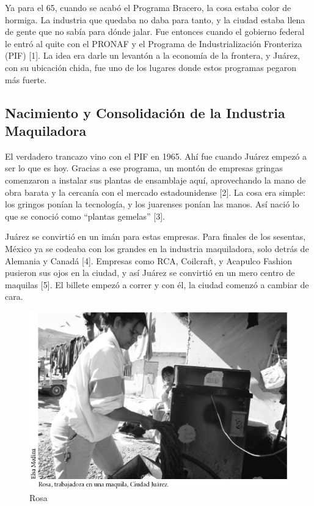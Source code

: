 \documentclass[
  10pt,
  letterpaper,
]{book}
\begin{document}
Ya para el 65, cuando se acabó el Programa Bracero, la cosa estaba color
de hormiga. La industria que quedaba no daba para tanto, y la ciudad
estaba llena de gente que no sabía para dónde jalar. Fue entonces cuando
el gobierno federal le entró al quite con el PRONAF y el Programa de
Industrialización Fronteriza (PIF) {[}1{]}. La idea era darle un
levantón a la economía de la frontera, y Juárez, con su ubicación chida,
fue uno de los lugares donde estos programas pegaron más fuerte.

\subsection{Nacimiento y Consolidación de la Industria
Maquiladora}\label{nacimiento-y-consolidaciuxf3n-de-la-industria-maquiladora}

El verdadero trancazo vino con el PIF en 1965. Ahí fue cuando Juárez
empezó a ser lo que es hoy. Gracias a ese programa, un montón de
empresas gringas comenzaron a instalar sus plantas de ensamblaje aquí,
aprovechando la mano de obra barata y la cercanía con el mercado
estadounidense {[}2{]}. La cosa era simple: los gringos ponían la
tecnología, y los juarenses ponían las manos. Así nació lo que se
conoció como ``plantas gemelas'' {[}3{]}.

Juárez se convirtió en un imán para estas empresas. Para finales de los
sesentas, México ya se codeaba con los grandes en la industria
maquiladora, solo detrás de Alemania y Canadá {[}4{]}. Empresas como
RCA, Coilcraft, y Acapulco Fashion pusieron sus ojos en la ciudad, y así
Juárez se convirtió en un mero centro de maquilas {[}5{]}. El billete
empezó a correr y con él, la ciudad comenzó a cambiar de cara.

\begin{figure}[H]

{\centering \includegraphics{Img/Rosa.jpg}

}

\caption{Rosa}

\end{figure}%
\end{document}

